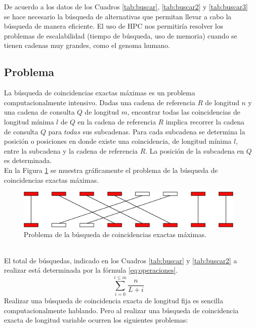 \documentclass[12pt,a4paper]{article}
\begin{document}
\indent
De acuerdo a los datos de los Cuadros \ref{tab:buscar}, \ref{tab:buscar2} y 
\ref{tab:buscar3} se hace necesario la búsqueda de alternativas que 
permitan llevar a cabo la búsqueda de manera eficiente. El uso de HPC nos permitiría
resolver los problemas de escalabilidad (tiempo de búsqueda, uso de memoria) cuando 
se tienen cadenas muy grandes, como el genoma humano.\\
\subsection*{Problema} 
\indent
La búsqueda de coincidencias exactas máximas es un problema computacionalmente
intensivo. Dadas una cadena de referencia $R$ de longitud $n$ y una cadena de consulta 
$Q$ de longitud $m$, encontrar todas las coincidencias de longitud mínima $l$ de $Q$
en la cadena de referencia $R$ implica recorrer la cadena de consulta $Q$ para $todas$
sus subcadenas. Para cada subcadena se determina la posición o posiciones en donde 
existe una coincidencia, de longitud mínima $l$, entre la subcadena y la cadena de 
referencia $R$. La posición de la subcadena en $Q$ es determinada.\\
\indent
En la Figura \ref{fig:problema} se muestra gráficamente el problema de la búsqueda
de coincidencias exactas máximas.
\begin{figure}[h]
\begin{center}
\includegraphics[scale=0.5]{gaps.png}
\caption{Problema de la búsqueda de coincidencias exactas máximas.}
\label{fig:problema}
\end{center}
\end{figure}
\\ \indent El total de búsquedas, indicado en los Cuadros \ref{tab:buscar} y \ref{tab:buscar2} 
a realizar está determinada por la fórmula \ref{eq:operaciones}.
\begin{equation}
  \sum_{i=0}^{i\le m}{\frac{n}{L+i}}
  \label{eq:operaciones}
\end{equation}
Realizar una búsqueda de coincidencia exacta de longitud fija es sencilla 
computacionalmente hablando. Pero al realizar una búsqueda de coincidencia exacta de 
longitud variable ocurren los siguientes problemas:
\end{document}
